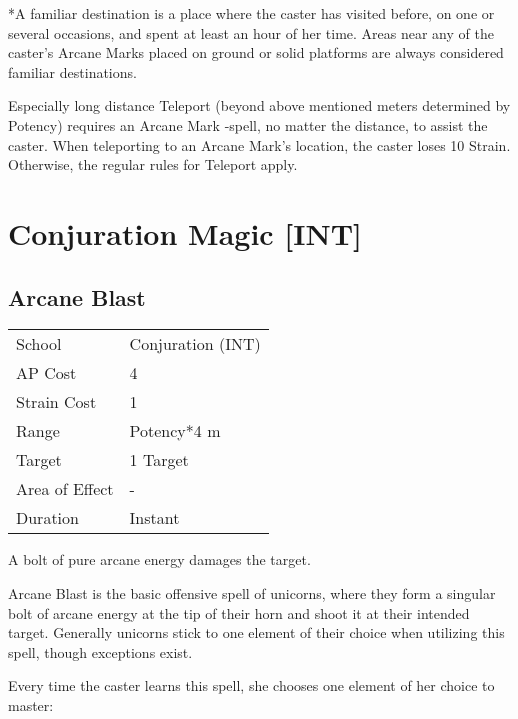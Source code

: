 \documentclass[11pt,a4paper,twocolumn]{book}
\begin{document}
\medskip

*A familiar destination is a place where the caster has visited before, on one or several occasions, and spent at least an hour of her time. Areas near any of the caster's Arcane Marks placed on ground or solid platforms are always considered familiar destinations.

Especially long distance Teleport (beyond above mentioned meters determined by Potency) requires an Arcane Mark -spell, no matter the distance, to assist the caster. When teleporting to an Arcane Mark's location, the caster loses 10 Strain. Otherwise, the regular rules for Teleport apply.

\bigskip

\section*{Conjuration Magic [INT]}

\subsection*{Arcane Blast}
{
	\begin{tabu} to 75mm{| X[l,4] | X[l,7] |}
		\hline
		School 			& Conjuration (INT) \\
		AP Cost	      	& 4 				\\
		Strain Cost     & 1 				\\
		Range     		& Potency*4 m 		\\
		Target      	& 1 Target 			\\
		Area of Effect  & - 	 			\\
		Duration     	& Instant 			\\ \hline
	\end{tabu}
	
}

\medskip

A bolt of pure arcane energy damages the target.

Arcane Blast is the basic offensive spell of unicorns, where they form a singular bolt of arcane energy at the tip of their horn and shoot it at their intended target. Generally unicorns stick to one element of their choice when utilizing this spell, though exceptions exist.

Every time the caster learns this spell, she chooses one element of her choice to master:
\end{document}
